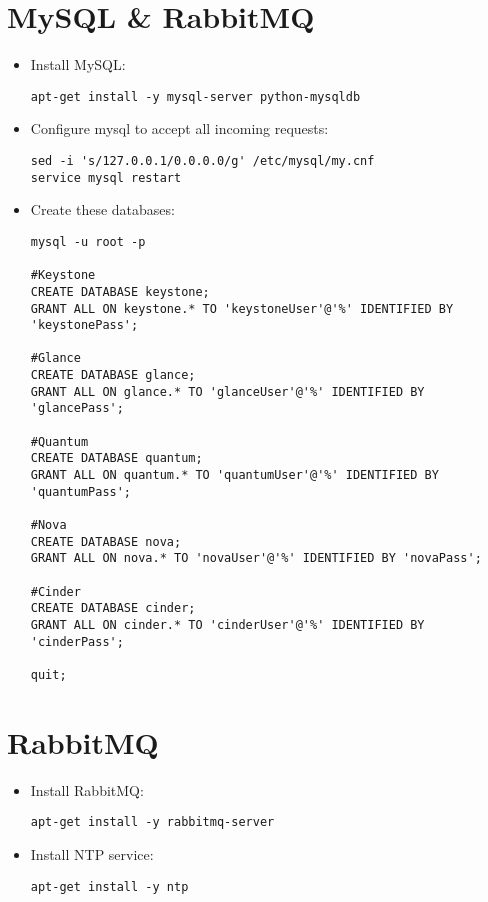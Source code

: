 \section{MySQL \& RabbitMQ}
\label{mysqlrabbitmq}

\begin{itemize}
\item Install MySQL:

\begin{verbatim}
apt-get install -y mysql-server python-mysqldb
\end{verbatim}


\item Configure mysql to accept all incoming requests:

\begin{verbatim}
sed -i 's/127.0.0.1/0.0.0.0/g' /etc/mysql/my.cnf
service mysql restart
\end{verbatim}


\item Create these databases:

\begin{verbatim}
mysql -u root -p  

#Keystone
CREATE DATABASE keystone;
GRANT ALL ON keystone.* TO 'keystoneUser'@'%' IDENTIFIED BY 'keystonePass';

#Glance
CREATE DATABASE glance;
GRANT ALL ON glance.* TO 'glanceUser'@'%' IDENTIFIED BY 'glancePass';

#Quantum
CREATE DATABASE quantum;
GRANT ALL ON quantum.* TO 'quantumUser'@'%' IDENTIFIED BY 'quantumPass';

#Nova
CREATE DATABASE nova;
GRANT ALL ON nova.* TO 'novaUser'@'%' IDENTIFIED BY 'novaPass';      

#Cinder
CREATE DATABASE cinder;
GRANT ALL ON cinder.* TO 'cinderUser'@'%' IDENTIFIED BY 'cinderPass';

quit;
\end{verbatim}


\end{itemize}

\section{RabbitMQ}
\label{rabbitmq}

\begin{itemize}
\item Install RabbitMQ:

\begin{verbatim}
apt-get install -y rabbitmq-server 
\end{verbatim}


\item Install NTP service:

\begin{verbatim}
apt-get install -y ntp
\end{verbatim}


\end{itemize}

